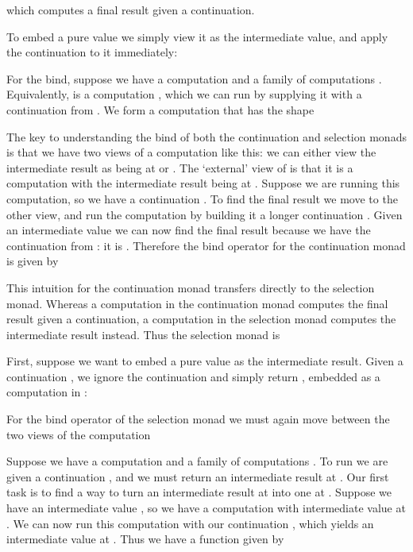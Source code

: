 \documentclass{article}
\begin{document}
which computes a final result given a continuation.

To embed a pure value  we simply view it as the intermediate value, and apply the continuation to it immediately:

For the bind, suppose we have a computation  and a family of computations . Equivalently,  is a computation , which we can run by supplying it with a continuation from . We form a computation that has the shape
\begin{center}\end{center}
The key to understanding the bind of both the continuation and selection monads is that we have two views of a computation like this: we can either view the intermediate result as being at  or . The `external' view of  is that it is a computation with the intermediate result being at . Suppose we are running this computation, so we have a continuation . To find the final result we move to the other view, and run the computation  by building it a longer continuation . Given an intermediate value  we can now find the final result  because we have the continuation  from : it is . Therefore the bind operator for the continuation monad is given by


This intuition for the continuation monad transfers directly to the selection monad. Whereas a computation in the continuation monad computes the final result given a continuation, a computation in the selection monad computes the intermediate result instead. Thus the selection monad is


First, suppose we want to embed a pure value  as the intermediate result. Given a continuation , we ignore the continuation and simply return , embedded as a computation in :


For the bind operator of the selection monad we must again move between the two views of the computation
\begin{center}\end{center}
Suppose we have a computation  and a family of computations . To run  we are given a continuation , and we must return an intermediate result at . Our first task is to find a way to turn an intermediate result at  into one at . Suppose we have an intermediate value , so we have a computation  with intermediate value at . We can now run this computation with our continuation , which yields an intermediate value at . Thus we have a function  given by
\end{document}
